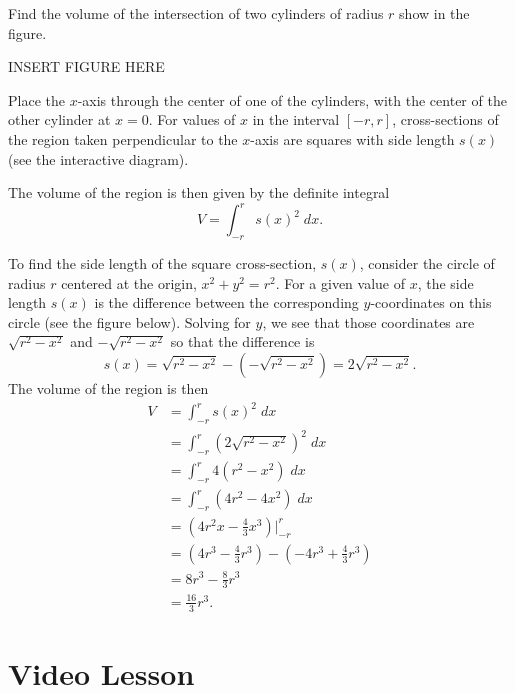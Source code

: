 \documentclass{ximera}
\begin{document}
 
 


\begin{example}  Find the volume of the intersection of two cylinders of radius $r$ show in the figure.

INSERT FIGURE HERE

Place the $x$-axis through the center of one of the cylinders, with the center of the other cylinder at $x = 0$.
For values of $x$ in the interval $[-r, r]$, cross-sections of the region taken perpendicular 
to the $x$-axis are squares with side length $s(x)$ (see the interactive diagram). 

The volume of the region is then given by the definite integral
\[
V = \int_{-r}^r s(x)^2 \; dx.
\]

To find the side length of the square cross-section, $s(x)$, consider the circle of radius $r$ centered at the origin, $x^2 + y^2 = r^2$. For a given value of $x$, the side 
length $s(x)$ is the difference between the corresponding $y$-coordinates on this circle (see the figure below). Solving for $y$, we see that those coordinates are 
$\sqrt{r^2 - x^2}$ and $-\sqrt{r^2 - x^2}$ so that the difference is 
\[
s(x) = \sqrt{r^2 - x^2}-(-\sqrt{r^2 - x^2}) = 2\sqrt{r^2 - x^2}.
\]
The volume of the region  is then
\begin{align*}
V &= \int_{-r}^r s(x)^2 \; dx\\
  &= \int_{-r}^r \left(2\sqrt{r^2 - x^2}\right)^2 \; dx\\
  &= \int_{-r}^r 4(r^2 - x^2) \; dx\\
  &= \int_{-r}^r (4r^2 - 4x^2) \; dx\\
  &= \left(4r^2x - \frac43x^3\right)\bigg|_{-r}^r\\
  &= \left(4r^3 - \frac43r^3\right) - \left(-4r^3 + \frac43 r^3\right)\\
  &= 8r^3 - \frac83 r^3\\
  &= \frac{16}{3} r^3.
\end{align*}

\end{example}



\section{Video Lesson}

\begin{center}
\begin{foldable}
\end{foldable}
\end{center}
\end{document}

